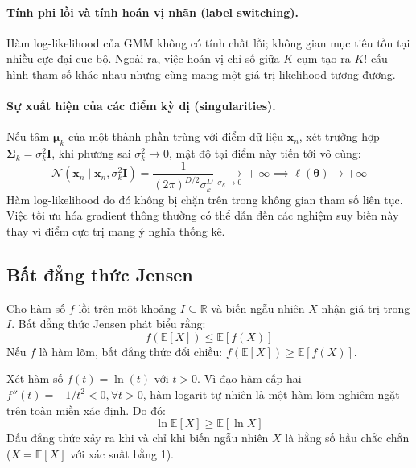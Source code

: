 \documentclass[12pt,a4paper]{article}
\newcommand{\vx}{\mathbf{x}}
\newcommand{\vmu}{\boldsymbol{\mu}}
\newcommand{\vSigma}{\boldsymbol{\Sigma}}
\newcommand{\vtheta}{\boldsymbol{\theta}}
\newcommand{\vI}{\mathbf{I}}
\newcommand{\Normal}{\mathcal{N}}
\newcommand{\Exp}{\mathbb{E}}
\newcommand{\R}{\mathbb{R}}
\begin{document}
\paragraph{Tính phi lồi và tính hoán vị nhãn (label switching).}
Hàm log-likelihood của GMM không có tính chất lồi; không gian mục tiêu tồn tại nhiều cực đại cục bộ. Ngoài ra, việc hoán vị chỉ số giữa $K$ cụm tạo ra $K!$ cấu hình tham số khác nhau nhưng cùng mang một giá trị likelihood tương đương.

\paragraph{Sự xuất hiện của các điểm kỳ dị (singularities).}
Nếu tâm $\vmu_k$ của một thành phần trùng với điểm dữ liệu $\vx_n$, xét trường hợp $\vSigma_k = \sigma_k^2 \vI$, khi phương sai $\sigma_k^2 \to 0$, mật độ tại điểm này tiến tới vô cùng:
\begin{equation}
    \Normal(\vx_n \mid \vx_n, \sigma_k^2 \vI) = \frac{1}{(2\pi)^{D/2} \sigma_k^D} \xrightarrow[\sigma_k \to 0]{} +\infty \implies \ell(\vtheta) \to +\infty
\end{equation}
Hàm log-likelihood do đó không bị chặn trên trong không gian tham số liên tục. Việc tối ưu hóa gradient thông thường có thể dẫn đến các nghiệm suy biến này thay vì điểm cực trị mang ý nghĩa thống kê.

\subsection{Bất đẳng thức Jensen}
\label{subsec:jensen}

Cho hàm số $f$ lồi trên một khoảng $I \subseteq \R$ và biến ngẫu nhiên $X$ nhận giá trị trong $I$. Bất đẳng thức Jensen phát biểu rằng:
\begin{equation}
    f(\Exp[X]) \le \Exp[f(X)] \label{eq:jensen_convex}
\end{equation}
Nếu $f$ là hàm lõm, bất đẳng thức đổi chiều: $f(\Exp[X]) \ge \Exp[f(X)]$. 

Xét hàm số $f(t) = \ln(t)$ với $t > 0$. Vì đạo hàm cấp hai $f''(t) = -1/t^2 < 0, \forall t > 0$, hàm logarit tự nhiên là một hàm lõm nghiêm ngặt trên toàn miền xác định. Do đó:
\begin{equation}
    \ln \Exp[X] \ge \Exp[\ln X] \label{eq:jensen_log}
\end{equation}
Dấu đẳng thức xảy ra khi và chỉ khi biến ngẫu nhiên $X$ là hằng số hầu chắc chắn ($X = \Exp[X]$ với xác suất bằng 1).
\end{document}
